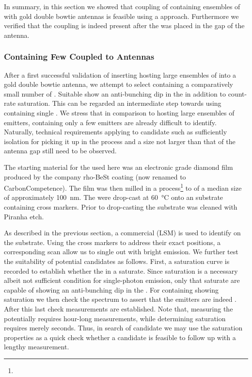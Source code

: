 			In summary, in this section we showed that coupling of \nds containing ensembles of \sivs with gold double bowtie antennas is feasible using a \pp approach. Furthermore we verified that the coupling is indeed present after the \nd was placed in the gap of the antenna.

		\FloatBarrier

		\subsubsection{\Nds Containing Few \Sivs Coupled to Antennas} \label{subsubsec::antenna_single_siv}

				After a first successful validation of inserting \nds hosting large ensembles of \sivs into a gold double bowtie antenna, we attempt to select \nds containing a comparatively small number of \sivs. Suitable \nds show an anti-bunching dip in the \gtf in addition to count-rate saturation. This can be regarded an intermediate step towards using \nds containing single \sivs. We stress that in comparison to \nds hosting large ensembles of emitters, \nds containing only a few emitters are already difficult to identify. Naturally, technical requirements applying to candidate \nds such as sufficiently isolation for picking it up in the \pp process and a size not larger than that of the antenna gap still need to be observed.
				
				The starting material for the \nds used here was an electronic grade diamond film produced by the company rho-BeSt coating (now renamed to CarbonCompetence).
				The film was then milled in a \basd process\footnote{\krueger} to \nds of a median size of approximately \SI{100}{nm}.
				The \nds were drop-cast at \SI{60}{\celsius} onto an \ir substrate containing cross markers. Prior to drop-casting the substrate was cleaned with Piranha etch.
			
				As described in the previous section, a commercial \lsm (LSM) is used to identify \nds on the substrate. Using the cross markers to address their exact positions, a corresponding \fl scan allow us to single out \nds with bright emission. We further test the suitability of potential candidates as follows. First, a saturation curve is recorded to establish whether the \sivs in a \nd saturate. Since saturation is a necessary albeit not sufficient condition for single-photon emission, only \nds that saturate are capable of showing an anti-bunching dip in the \gtf. For \nds containing \sivs showing saturation we then check the spectrum to assert that the emitters are indeed \sivs. After this last check \gtf measurements are established. Note that, measuring the \gtf potentially requires hour-long measurements, while determining saturation requires merely seconds. Thus, in search of candidate \nds we may use the saturation properties as a quick check whether a candidate is feasible to follow up with a lengthy \gtf measurement.
				
